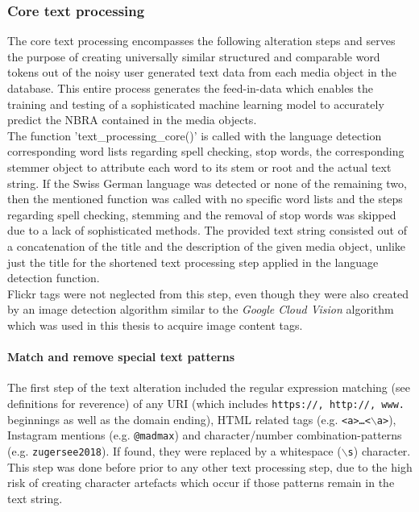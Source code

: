 \subsubsection{Core text processing} \label{core_text_processing}
The core text processing encompasses the following alteration steps and serves the purpose of creating universally similar structured and comparable word tokens out of the noisy user generated text data from each media object in the database. This entire process generates the feed-in-data which enables the training and testing of a sophisticated machine learning model to accurately predict the NBRA contained in the media objects.\\
\newline
The function 'text\_processing\_core()' is called with the language detection corresponding word lists regarding spell checking, stop words, the corresponding stemmer object to attribute each word to its stem or root and the actual text string. If the Swiss German language was detected or none of the remaining two, then the mentioned function was called with no specific word lists and the steps regarding spell checking, stemming and the removal of stop words was skipped due to a lack of sophisticated methods. The provided text string consisted out of a concatenation of the title and the description of the given media object, unlike just the title for the shortened text processing step applied in the language detection function.\\
Flickr tags were not neglected from this step, even though they were also created by an image detection algorithm similar to the \textit{Google Cloud Vision} algorithm which was used in this thesis to acquire image content tags.

\paragraph{Match and remove special text patterns} \label{text_patterns}
The first step of the text alteration included the regular expression matching (see definitions for reverence) of any URI (which includes \texttt{https://, http://, www.} beginnings as well as the domain ending), HTML related tags (e.g. \texttt{<a>\dots<$\backslash$a>}), Instagram mentions (e.g. \texttt{@madmax}) and character/number combination-patterns (e.g. \texttt{zugersee2018}). If found, they were replaced by a whitespace (\texttt{$\backslash$s}) character. This step was done before prior to any other text processing step, due to the high risk of creating character artefacts which occur if those patterns remain in the text string.

